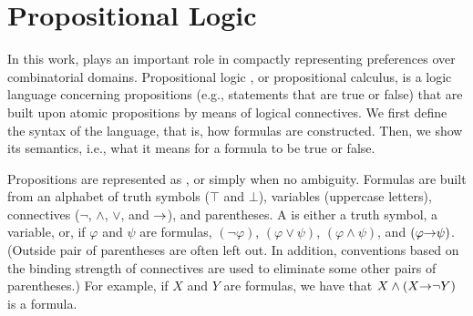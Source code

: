 \section{Propositional Logic}
In this work,  plays an important role in compactly representing
preferences over combinatorial domains.
Propositional logic \cite{heindiscrete}, or propositional calculus, is a logic language concerning
propositions (e.g., statements that are true or false) that are built upon atomic propositions
by means of logical connectives.
We first define the syntax of the language, that is, how formulas are constructed.
Then, we show its semantics, i.e., what it means for a formula to be true or false.

Propositions are represented as , or simply  when no ambiguity.
Formulas are built from an alphabet of truth symbols ($\top$ and $\bot$),
variables (uppercase letters), connectives ($\neg$, $\land$, $\lor$, and $\mathit{\rightarrow}$), and parentheses.
A  is either a truth symbol, a variable, or, if $\varphi$ and $\psi$ are formulas,
$(\neg \varphi)$, $(\varphi \lor \psi)$, $(\varphi \land \psi)$, and
$(\varphi \mathit{\rightarrow} \psi)$. (Outside pair of parentheses are often left out.
In addition, conventions based on the binding strength of connectives
are used to eliminate some other pairs of parentheses.)
For example, if $X$ and $Y$ are formulas, we have that $X \land (X \mathit{\rightarrow} \neg Y)$ is a formula.

%

